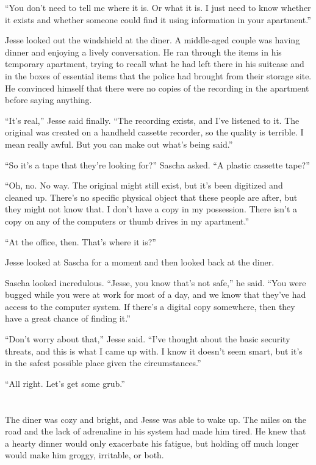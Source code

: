\documentclass[12pt]{book}
\begin{document}
``You don't need to tell me where it is.  Or what it is.  I just need to know whether it exists and whether someone could find it using information in your apartment.''

Jesse looked out the windshield at the diner.  A middle-aged couple was having dinner and enjoying a lively conversation.  He ran through the items in his temporary apartment, trying to recall what he had left there in his suitcase and in the boxes of essential items that the police had brought from their storage site.  He convinced himself that there were no copies of the recording in the apartment before saying anything.

``It's real,'' Jesse said finally.  ``The recording exists, and I've listened to it.  The original was created on a handheld cassette recorder, so the quality is terrible.  I mean really awful.  But you can make out what's being said.''

``So it's a tape that they're looking for?'' Sascha asked.  ``A plastic cassette tape?''

``Oh, no.  No way.  The original might still exist, but it's been digitized and cleaned up.  There's no specific physical object that these people are after, but they might not know that.  I don't have a copy in my possession.  There isn't a copy on any of the computers or thumb drives in my apartment.''

``At the office, then.  That's where it is?''

Jesse looked at Sascha for a moment and then looked back at the diner.

Sascha looked incredulous.  ``Jesse, you know that's not safe,'' he said.  ``You were bugged while you were at work for most of a day, and we know that they've had access to the computer system.  If there's a digital copy somewhere, then they have a great chance of finding it.''

``Don't worry about that,'' Jesse said.  ``I've thought about the basic security threats, and this is what I came up with.  I know it doesn't seem smart, but it's in the safest possible place given the circumstances.''

``All right.  Let's get some grub.''

\chapter{}

The diner was cozy and bright, and Jesse was able to wake up.  The miles on the road and the lack of adrenaline in his system had made him tired.  He knew that a hearty dinner would only exacerbate his fatigue, but holding off much longer would make him groggy, irritable, or both.
\end{document}
